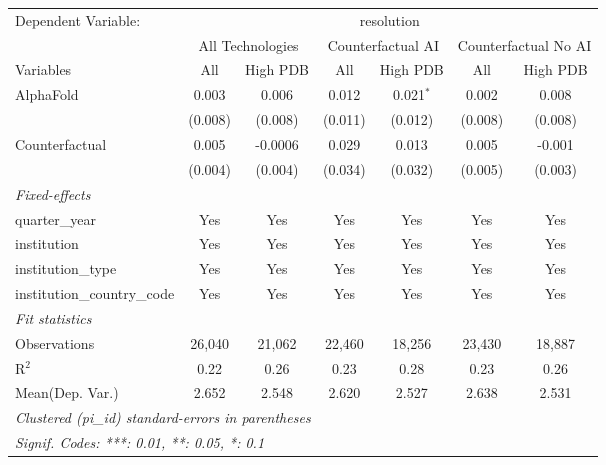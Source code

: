 \begingroup
\centering
\begin{tabular}{lcccccc}
   \tabularnewline \midrule \midrule
   Dependent Variable: & \multicolumn{6}{c}{resolution}\\
 & \multicolumn{2}{c}{All Technologies} & \multicolumn{2}{c}{Counterfactual AI} & \multicolumn{2}{c}{Counterfactual No AI} \\
\cmidrule(lr){1-1}\cmidrule(lr){2-3} \cmidrule(lr){4-5} \cmidrule(lr){6-7}
Variables & \multicolumn{1}{c}{All} & \multicolumn{1}{c}{High PDB} & \multicolumn{1}{c}{All} & \multicolumn{1}{c}{High PDB} & \multicolumn{1}{c}{All} & \multicolumn{1}{c}{High PDB} \\
\cmidrule(lr){1-1}\cmidrule(lr){2-2} \cmidrule(lr){3-3} \cmidrule(lr){4-4} \cmidrule(lr){5-5} \cmidrule(lr){6-6} \cmidrule(lr){7-7}
   AlphaFold                    & 0.003   & 0.006   & 0.012   & 0.021$^{*}$ & 0.002   & 0.008\\   
                                & (0.008) & (0.008) & (0.011) & (0.012)     & (0.008) & (0.008)\\   
   Counterfactual               & 0.005   & -0.0006 & 0.029   & 0.013       & 0.005   & -0.001\\   
                                & (0.004) & (0.004) & (0.034) & (0.032)     & (0.005) & (0.003)\\   
   \midrule
   \emph{Fixed-effects}\\
   quarter\_year                & Yes     & Yes     & Yes     & Yes         & Yes     & Yes\\  
   institution                  & Yes     & Yes     & Yes     & Yes         & Yes     & Yes\\  
   institution\_type            & Yes     & Yes     & Yes     & Yes         & Yes     & Yes\\  
   institution\_country\_code   & Yes     & Yes     & Yes     & Yes         & Yes     & Yes\\  
   \midrule
   \emph{Fit statistics}\\
   Observations                 & 26,040  & 21,062  & 22,460  & 18,256      & 23,430  & 18,887\\  
   R$^2$                        & 0.22    & 0.26    & 0.23    & 0.28        & 0.23    & 0.26\\  
Mean(Dep. Var.) & 2.652 & 2.548 & 2.620 & 2.527 & 2.638 & 2.531 \\
   \midrule \midrule
   \multicolumn{7}{l}{\emph{Clustered (pi\_id) standard-errors in parentheses}}\\
   \multicolumn{7}{l}{\emph{Signif. Codes: ***: 0.01, **: 0.05, *: 0.1}}\\
\end{tabular}
\par\endgroup
